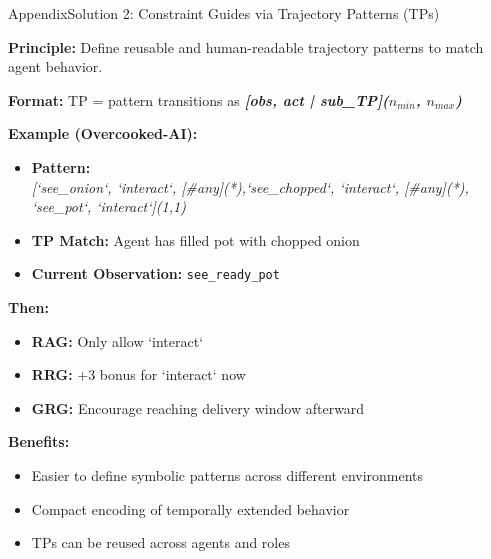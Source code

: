 \begin{frame}{Appendix}{Solution 2: Constraint Guides via Trajectory Patterns (TPs)}

\textbf{Principle:} Define reusable and human-readable trajectory patterns to match agent behavior.

\vspace{0.5em}
\textbf{Format:} TP = pattern transitions as \textbf{\textit{[obs, act | sub\_TP]($n_{min}$, $n_{max}$)}}

\textbf{Example (Overcooked-AI):}

\begin{itemize}
  \item \textbf{Pattern:} \\ \textit{[`see\_onion`, `interact`, [\#any](*),`see\_chopped`, `interact`, [\#any](*), `see\_pot`, `interact`](1,1)}
  \item \textbf{TP Match:} Agent has filled pot with chopped onion
  \item \textbf{Current Observation:} \texttt{see\_ready\_pot}
\end{itemize}

\textbf{Then:}
\begin{itemize}
  \item \textbf{RAG:} Only allow `interact`
  \item \textbf{RRG:} +3 bonus for `interact` now
  \item \textbf{GRG:} Encourage reaching delivery window afterward
\end{itemize}

\textbf{Benefits:}
\begin{itemize}
  \item Easier to define symbolic patterns across different environments
  \item Compact encoding of temporally extended behavior
  \item TPs can be reused across agents and roles
\end{itemize}

\end{frame}

